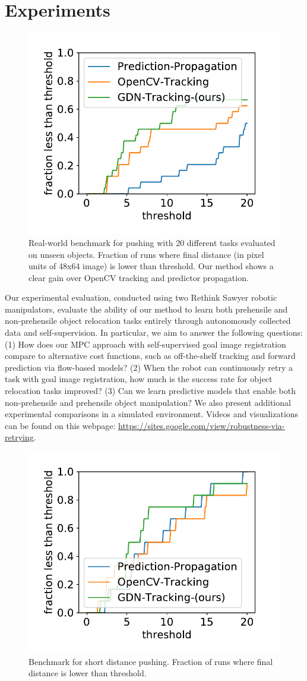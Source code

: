 
\vspace{-0.1cm}
\section{Experiments}
\vspace{-0.2cm}

\begin{figure}
\vspace{-0.3in}
\centering
\includegraphics[width=0.35\columnwidth]{images/pushlong_bench_same_range.pdf}
\caption{\small{Real-world benchmark for pushing with 20 different tasks evaluated on unseen objects. Fraction of runs where final distance (in pixel units of 48x64 image) is lower than threshold. Our method shows a clear gain over OpenCV tracking and predictor propagation.}}
\label{fig:push_bench_long}
\vspace{-0.3in}
\end{figure}


Our experimental evaluation, conducted using two Rethink Sawyer robotic manipulators, evaluate the ability of our method to learn both prehensile and non-prehensile object relocation tasks entirely through autonomously collected data and self-supervision. In particular, we aim to answer the following questions: (1) How does our MPC approach with self-supervised goal image registration compare to alternative cost functions, such as off-the-shelf tracking and forward prediction via flow-based models? (2) When the robot can continuously retry a task with goal image registration, how much is the success rate for object relocation tasks improved? (3) Can we learn predictive models that enable both non-prehensile and prehensile object manipulation? We also present additional experimental comparisons in a simulated environment.
Videos and visualizations can be found on this webpage: \url{https://sites.google.com/view/robustness-via-retrying}.

\begin{figure}
	\vspace{-0.3in}
	\centering
	\includegraphics[width=0.35\columnwidth]{images/pushshort_bench_plots.pdf}
	\caption{\small{Benchmark for short distance pushing.  Fraction of runs where final distance is lower than threshold.}}
	\label{fig:push_bench_short}
\end{figure}

